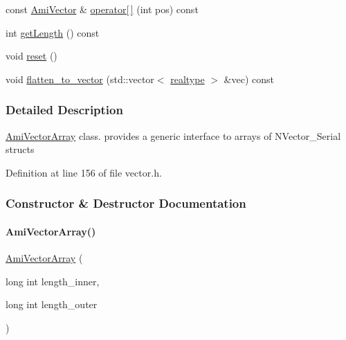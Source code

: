 \begin{DoxyCompactItemize}
\item 
const \mbox{\hyperlink{classamici_1_1_ami_vector}{Ami\+Vector}} \& \mbox{\hyperlink{classamici_1_1_ami_vector_array_a45a615cf5e4b550783ee23560c834941}{operator\mbox{[}$\,$\mbox{]}}} (int pos) const
\item 
int \mbox{\hyperlink{classamici_1_1_ami_vector_array_a5f00d4dc3e7866d193ce926f35542801}{get\+Length}} () const
\item 
void \mbox{\hyperlink{classamici_1_1_ami_vector_array_ad20897c5c8bd47f5d4005989bead0e55}{reset}} ()
\item 
void \mbox{\hyperlink{classamici_1_1_ami_vector_array_ab084098fb95a107daadc484ee7b5dd76}{flatten\+\_\+to\+\_\+vector}} (std\+::vector$<$ \mbox{\hyperlink{namespaceamici_a1bdce28051d6a53868f7ccbf5f2c14a3}{realtype}} $>$ \&vec) const
\end{DoxyCompactItemize}


\subsubsection{Detailed Description}
\mbox{\hyperlink{classamici_1_1_ami_vector_array}{Ami\+Vector\+Array}} class. provides a generic interface to arrays of N\+Vector\+\_\+\+Serial structs 

Definition at line 156 of file vector.\+h.



\subsubsection{Constructor \& Destructor Documentation}
\mbox{\label{classamici_1_1_ami_vector_array_a331a7814672b817a7c38328e78eaaedd}} 
\paragraph{\texorpdfstring{AmiVectorArray()}{AmiVectorArray()}\hspace{0.1cm}{\footnotesize\ttfamily [1/2]}}
{\footnotesize\ttfamily \mbox{\hyperlink{classamici_1_1_ami_vector_array}{Ami\+Vector\+Array}} (\begin{DoxyParamCaption}\item[{long int}]{length\+\_\+inner,  }\item[{long int}]{length\+\_\+outer }\end{DoxyParamCaption})}


